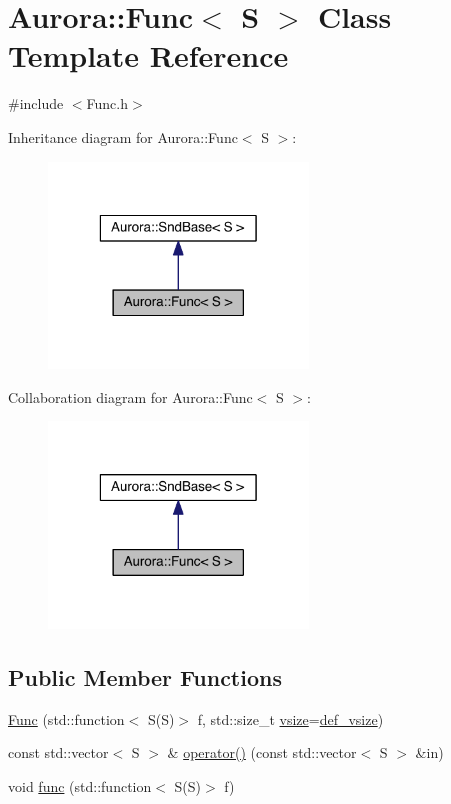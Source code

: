 \hypertarget{class_aurora_1_1_func}{}\section{Aurora\+:\+:Func$<$ S $>$ Class Template Reference}
\label{class_aurora_1_1_func}


{\ttfamily \#include $<$Func.\+h$>$}



Inheritance diagram for Aurora\+:\+:Func$<$ S $>$\+:\nopagebreak
\begin{figure}[H]
\begin{center}
\leavevmode
\includegraphics[width=196pt]{class_aurora_1_1_func__inherit__graph}
\end{center}
\end{figure}


Collaboration diagram for Aurora\+:\+:Func$<$ S $>$\+:\nopagebreak
\begin{figure}[H]
\begin{center}
\leavevmode
\includegraphics[width=196pt]{class_aurora_1_1_func__coll__graph}
\end{center}
\end{figure}
\subsection*{Public Member Functions}
\begin{DoxyCompactItemize}
\item 
\hyperlink{class_aurora_1_1_func_a4d45462ffab2c3a5172042411634539e}{Func} (std\+::function$<$ S(S)$>$ f, std\+::size\+\_\+t \hyperlink{class_aurora_1_1_snd_base_af9e21aaf411b17f7a8221c991ce5d291}{vsize}=\hyperlink{namespace_aurora_afaaddf667a06e7ce23c667a8b7295263}{def\+\_\+vsize})
\item 
const std\+::vector$<$ S $>$ \& \hyperlink{class_aurora_1_1_func_a60e9dad421d80a9f9eb99cfbac104729}{operator()} (const std\+::vector$<$ S $>$ \&in)
\item 
void \hyperlink{class_aurora_1_1_func_ac0bab9c63c823a9fc2058b9ce41e8da6}{func} (std\+::function$<$ S(S)$>$ f)
\end{DoxyCompactItemize}
